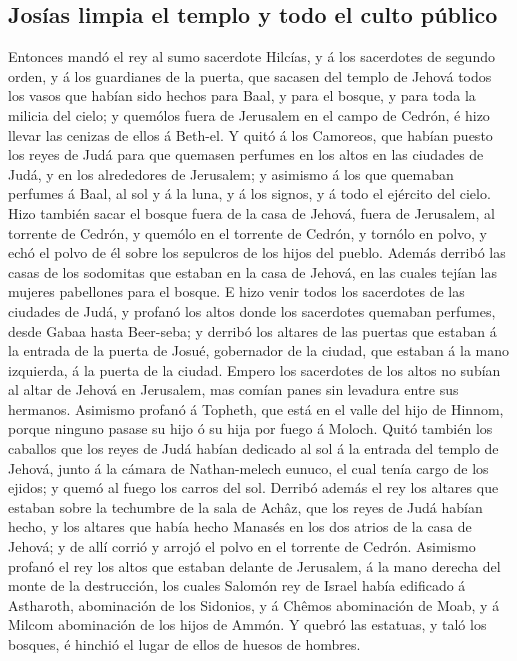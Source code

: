 \hypertarget{josuxedas-limpia-el-templo-y-todo-el-culto-puxfablico}{%
\subsection{Josías limpia el templo y todo el culto
público}\label{josuxedas-limpia-el-templo-y-todo-el-culto-puxfablico}}

 Entonces mandó el rey al sumo sacerdote Hilcías, y á los
sacerdotes de segundo orden, y á los guardianes de la puerta, que
sacasen del templo de Jehová todos los vasos que habían sido hechos para
Baal, y para el bosque, y para toda la milicia del cielo; y quemólos
fuera de Jerusalem en el campo de Cedrón, é hizo llevar las cenizas de
ellos á Beth-el.  Y quitó á los Camoreos, que habían
puesto los reyes de Judá para que quemasen perfumes en los altos en las
ciudades de Judá, y en los alrededores de Jerusalem; y asimismo á los
que quemaban perfumes á Baal, al sol y á la luna, y á los signos, y á
todo el ejército del cielo.  Hizo también sacar el bosque
fuera de la casa de Jehová, fuera de Jerusalem, al torrente de Cedrón, y
quemólo en el torrente de Cedrón, y tornólo en polvo, y echó el polvo de
él sobre los sepulcros de los hijos del pueblo.  Además
derribó las casas de los sodomitas que estaban en la casa de Jehová, en
las cuales tejían las mujeres pabellones para el bosque. 
E hizo venir todos los sacerdotes de las ciudades de Judá, y profanó los
altos donde los sacerdotes quemaban perfumes, desde Gabaa hasta
Beer-seba; y derribó los altares de las puertas que estaban á la entrada
de la puerta de Josué, gobernador de la ciudad, que estaban á la mano
izquierda, á la puerta de la ciudad.  Empero los
sacerdotes de los altos no subían al altar de Jehová en Jerusalem, mas
comían panes sin levadura entre sus hermanos.  Asimismo
profanó á Topheth, que está en el valle del hijo de Hinnom, porque
ninguno pasase su hijo ó su hija por fuego á Moloch. 
Quitó también los caballos que los reyes de Judá habían dedicado al sol
á la entrada del templo de Jehová, junto á la cámara de Nathan-melech
eunuco, el cual tenía cargo de los ejidos; y quemó al fuego los carros
del sol.  Derribó además el rey los altares que estaban
sobre la techumbre de la sala de Achâz, que los reyes de Judá habían
hecho, y los altares que había hecho Manasés en los dos atrios de la
casa de Jehová; y de allí corrió y arrojó el polvo en el torrente de
Cedrón.  Asimismo profanó el rey los altos que estaban
delante de Jerusalem, á la mano derecha del monte de la destrucción, los
cuales Salomón rey de Israel había edificado á Astharoth, abominación de
los Sidonios, y á Chêmos abominación de Moab, y á Milcom abominación de
los hijos de Ammón.  Y quebró las estatuas, y taló los
bosques, é hinchió el lugar de ellos de huesos de hombres.

